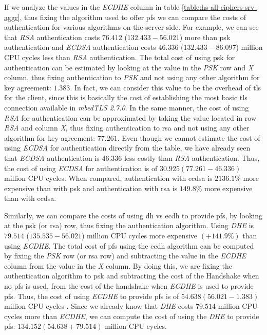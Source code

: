 If we analyze the values in the \textit{ECDHE} column in table \ref{table:hs-all-ciphers-srv-aggr}, thus fixing the
algorithm used to offer \gls{pfs} we can compare the costs of authentication for various algorithms on the server-side.
For example, we can see that \textit{RSA} authentication costs $76.412$ ($132.433-56.021$) more than \gls{psk}
authentication and \textit{ECDSA} authentication costs $46.336$ ($132.433-86.097$) million CPU cycles less
than \textit{RSA} authentication. The total cost of using \gls{psk} for authentication can be estimated
by looking at the
value in the \textit{PSK} row and \textit{X} column, thus fixing authentication to \textit{PSK} and not using any other
algorithm for key agreement: $1.383$. In fact, we can consider this value to be the overhead of \gls{tls} for the client,
since this is basically the cost of establishing the most basic \gls{tls} connection available in \textit{mbedTLS 2.7.0}.
In the same manner, the cost of using \textit{RSA} for authentication can
be approximated by taking the value located in row \textit{RSA} and column \textit{X}, thus fixing authentication
to \gls{rsa} and not using any other algorithm for key agreement: $77.261$. Even though we cannot estimate the cost
of using \textit{ECDSA} for authentication directly from the table, we have already seen that \textit{ECDSA} authentication
is $46.336$ less costly than \textit{RSA} authentication. Thus, the cost of using \textit{ECDSA} for authentication
is of $30.925 (77.261-46.336)$ million CPU cycles. When compared, authentication with \gls{ecdsa} is
$2136.1\%$ more expensive than with \gls{psk} and authentication with \gls{rsa} is $149.8\%$ more expensive
than with \gls{ecdsa}.

Similarly, we can compare the costs of using \gls{dh} vs \gls{ecdh} to provide \gls{pfs}, by
looking at the \gls{psk} (or \gls{rsa}) row, thus fixing the authentication algorithm. Using \textit{DHE} is
$79.514$ ($135.535 - 56.021$) million CPU cycles more expensive $(+141.9\%)$ than using \textit{ECDHE}. The total cost of \gls{pfs}
using the \gls{ecdh} algorithm can be computed by fixing the \textit{PSK} row (or \gls{rsa} row)
and subtracting the value in the \textit{ECDHE} column from the value in the \textit{X} column. By doing this, we are
fixing the authentication algorithm to \gls{psk} and subtracting the cost of the Handshake when no \gls{pfs} is used,
from the cost of the handshake when \textit{ECDHE} is used to provide \gls{pfs}. Thus, the cost of using \textit{ECDHE}
to provide \gls{pfs} is of $54.638 (56.021-1.383)$ million CPU cycles . Since we already know that \textit{DHE} costs
$79.514$ million CPU cycles more than \textit{ECDHE}, we can compute the cost of using the \textit{DHE} to
provide \gls{pfs}: $134.152 (54.638+79.514)$ million CPU cycles.

